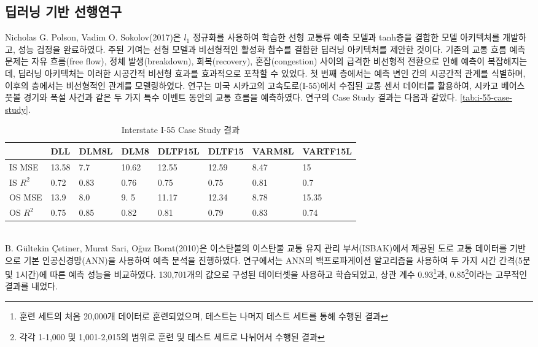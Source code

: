\documentclass[11pt]{report}
\begin{document}
\subsection{딥러닝 기반 선행연구}
Nicholas G. Polson, Vadim O. Sokolov(2017)은 $l_1$ 정규화를 사용하여 학습한 선형 교통류 예측 모델과 tanh층을 결합한 모델 아키텍처를 개발하고, 성능 검정을 완료하였다. 
주된 기여는 선형 모델과 비선형적인 활성화 함수를 결합한 딥러닝 아키텍처를 제안한 것이다. 
기존의 교통 흐름 예측 문제는 자유 흐름(free flow), 정체 발생(breakdown), 회복(recovery), 혼잡(congestion) 사이의 급격한 비선형적 전환으로 인해 예측이 복잡해지는데, 딥러닝 아키텍처는 이러한 시공간적 비선형 효과를 효과적으로 포착할 수 있었다. 
첫 번째 층에서는 예측 변인 간의 시공간적 관계를 식별하며, 이후의 층에서는 비선형적인 관계를 모델링하였다.  
연구는 미국 시카고의 고속도로(I-55)에서 수집된 교통 센서 데이터를 활용하여, 시카고 베어스 풋볼 경기와 폭설 사건과 같은 두 가지 특수 이벤트 동안의 교통 흐름을 예측하였다. 
연구의 Case Study 결과는 다음과 같았다. \autoref{tab:i-55-case-study}. 
\begin{table}[H]
	\begin{tabular}{llllllll}
			 & DLL   & DLM8L & DLM8  & DLTF15L & DLTF15 & VARM8L & VARTF15L \\ \hline
	IS MSE   & 13.58 & 7.7   & 10.62 & 12.55   & 12.59  & 8.47   & 15       \\ \hline
	IS $R^2$ & 0.72  & 0.83  & 0.76  & 0.75    & 0.75   & 0.81   & 0.7      \\ \hline
	OS MSE   & 13.9  & 8.0   & 9. 5  & 11.17   & 12.34  & 8.78   & 15.35    \\ \hline
	OS $R^2$ & 0.75  & 0.85  & 0.82  & 0.81    & 0.79   & 0.83   & 0.74     \\ \hline
	\end{tabular}
	\caption{Interstate I-55 Case Study 결과}
	\label{tab:i-55-case-study}
\end{table}
\\
\indent B. Gültekin Çetiner, Murat Sari, Oğuz Borat(2010)은 이스탄불의 이스탄불 교통 유지 관리 부서(ISBAK)에서 제공된 도로 교통 데이터를 기반으로 기본 인공신경망(ANN)을 사용하여 예측 분석을 진행하였다. 
연구에서는 ANN의 백프로파게이션 알고리즘을 사용하여 두 가지 시간 간격(5분 및 1시간)에 따른 예측 성능을 비교하였다. 
130,701개의 값으로 구성된 데이터셋을 사용하고 학습되었고, 상관 계수 0.93\footnote{훈련 세트의 처음 20,000개 데이터로 훈련되었으며, 테스트는 나머지 테스트 세트를 통해 수행된 결과}과, 0.85\footnote{각각 1-1,000 및 1,001-2,015의 범위로 훈련 및 테스트 세트로 나뉘어서 수행된 결과}이라는 고무적인 결과를 내었다. \\
\end{document}
